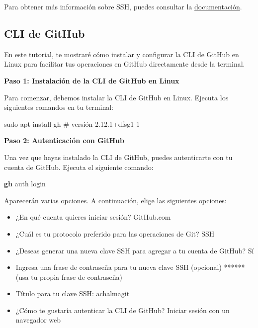 \documentclass[
  letterpaper,
  DIV=11,
  numbers=noendperiod]{scrartcl}
\newenvironment{Shaded}{}{}
\newcommand{\CommentTok}[1]{\textcolor[rgb]{0.42,0.45,0.49}{#1}}
\newcommand{\ExtensionTok}[1]{\textcolor[rgb]{0.84,0.23,0.29}{\textbf{#1}}}
\newcommand{\FunctionTok}[1]{\textcolor[rgb]{0.44,0.26,0.76}{#1}}
\newcommand{\NormalTok}[1]{\textcolor[rgb]{0.14,0.16,0.18}{#1}}
\providecommand{\tightlist}{%
  \setlength{\itemsep}{0pt}\setlength{\parskip}{0pt}}\usepackage{longtable,booktabs,array}
\begin{document}
Para obtener más información sobre SSH, puedes consultar la
\href{https://cli.github.com/}{documentación}.

\hypertarget{cli-de-github}{%
\subsection{CLI de GitHub}\label{cli-de-github}}

En este tutorial, te mostraré cómo instalar y configurar la CLI de
GitHub en Linux para facilitar tus operaciones en GitHub directamente
desde la terminal.

\textbf{Paso 1: Instalación de la CLI de GitHub en Linux}

Para comenzar, debemos instalar la CLI de GitHub en Linux. Ejecuta los
siguientes comandos en tu terminal:

\begin{Shaded}
\begin{Highlighting}[]
\FunctionTok{sudo}\NormalTok{ apt install gh }\CommentTok{\# versión 2.12.1+dfsg1{-}1}
\end{Highlighting}
\end{Shaded}

\textbf{Paso 2: Autenticación con GitHub}

Una vez que hayas instalado la CLI de GitHub, puedes autenticarte con tu
cuenta de GitHub. Ejecuta el siguiente comando:

\begin{Shaded}
\begin{Highlighting}[]
\ExtensionTok{gh}\NormalTok{ auth login}
\end{Highlighting}
\end{Shaded}

Aparecerán varias opciones. A continuación, elige las siguientes
opciones:

\begin{itemize}
\tightlist
\item
  ¿En qué cuenta quieres iniciar sesión? GitHub.com
\item
  ¿Cuál es tu protocolo preferido para las operaciones de Git? SSH
\item
  ¿Deseas generar una nueva clave SSH para agregar a tu cuenta de
  GitHub? Sí
\item
  Ingresa una frase de contraseña para tu nueva clave SSH (opcional)
  ****** (usa tu propia frase de contraseña)
\item
  Título para tu clave SSH: achalmagit
\item
  ¿Cómo te gustaría autenticar la CLI de GitHub? Iniciar sesión con un
  navegador web
\end{itemize}
\end{document}
